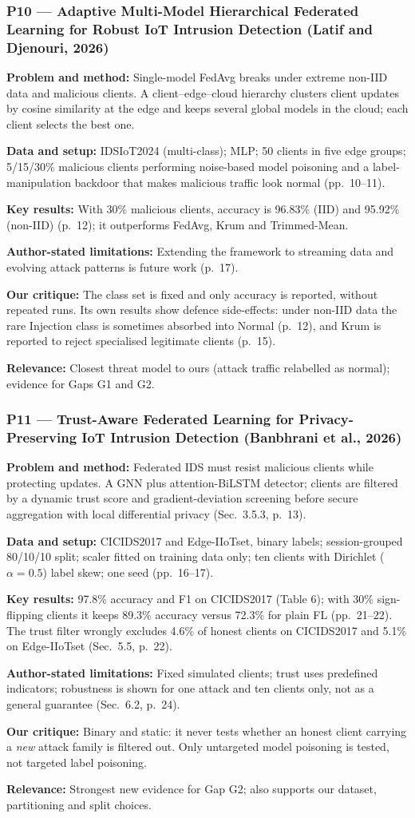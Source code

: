 \documentclass[10pt,a4paper]{article}
\newcommand{\sumitem}[2]{\noindent\textbf{#1:} #2\par}
\begin{document}
\subsubsection*{P10 --- Adaptive Multi-Model Hierarchical Federated Learning for Robust IoT Intrusion Detection (Latif and Djenouri, 2026)}
\sumitem{Problem and method}{Single-model FedAvg breaks under extreme non-IID data and malicious clients. A client--edge--cloud hierarchy clusters client updates by cosine similarity at the edge and keeps several global models in the cloud; each client selects the best one.}
\sumitem{Data and setup}{IDSIoT2024 (multi-class); MLP; 50 clients in five edge groups; 5/15/30\% malicious clients performing noise-based model poisoning and a label-manipulation backdoor that makes malicious traffic look normal (pp.~10--11).}
\sumitem{Key results}{With 30\% malicious clients, accuracy is 96.83\% (IID) and 95.92\% (non-IID) (p.~12); it outperforms FedAvg, Krum and Trimmed-Mean.}
\sumitem{Author-stated limitations}{Extending the framework to streaming data and evolving attack patterns is future work (p.~17).}
\sumitem{Our critique}{The class set is fixed and only accuracy is reported, without repeated runs. Its own results show defence side-effects: under non-IID data the rare Injection class is sometimes absorbed into Normal (p.~12), and Krum is reported to reject specialised legitimate clients (p.~15).}
\sumitem{Relevance}{Closest threat model to ours (attack traffic relabelled as normal); evidence for Gaps G1 and G2.}

\subsubsection*{P11 --- Trust-Aware Federated Learning for Privacy-Preserving IoT Intrusion Detection (Banbhrani et al., 2026)}
\sumitem{Problem and method}{Federated IDS must resist malicious clients while protecting updates. A GNN plus attention-BiLSTM detector; clients are filtered by a dynamic trust score and gradient-deviation screening before secure aggregation with local differential privacy (Sec.~3.5.3, p.~13).}
\sumitem{Data and setup}{CICIDS2017 and Edge-IIoTset, binary labels; session-grouped 80/10/10 split; scaler fitted on training data only; ten clients with Dirichlet ($\alpha=0.5$) label skew; one seed (pp.~16--17).}
\sumitem{Key results}{97.8\% accuracy and F1 on CICIDS2017 (Table 6); with 30\% sign-flipping clients it keeps 89.3\% accuracy versus 72.3\% for plain FL (pp.~21--22). The trust filter wrongly excludes 4.6\% of honest clients on CICIDS2017 and 5.1\% on Edge-IIoTset (Sec.~5.5, p.~22).}
\sumitem{Author-stated limitations}{Fixed simulated clients; trust uses predefined indicators; robustness is shown for one attack and ten clients only, not as a general guarantee (Sec.~6.2, p.~24).}
\sumitem{Our critique}{Binary and static: it never tests whether an honest client carrying a \emph{new} attack family is filtered out. Only untargeted model poisoning is tested, not targeted label poisoning.}
\sumitem{Relevance}{Strongest new evidence for Gap G2; also supports our dataset, partitioning and split choices.}
\end{document}
